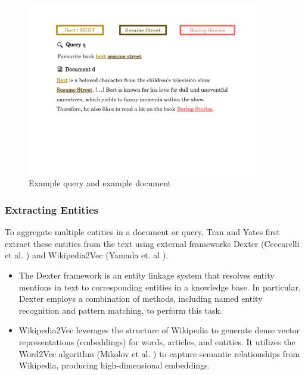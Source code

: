 \begin{figure}[!htb]
    \centering
    \includegraphics[trim={1.5cm 6.7cm 1.5cm 2cm}, clip, width=0.9\textwidth]{resources/example_2} 
    \caption{Example query and example document}
    \label{fig:example}
\end{figure}

\subsubsection{Extracting Entities}\label{subsubsec:extracting_entities}

To aggregate multiple entities in a document or query, Tran and Yates first extract these entities from the text using external frameworks Dexter (Ceccarelli et al. \cite{ceccarelli2013dexter}) and Wikipedia2Vec (Yamada et. al \cite{yamada2018wikipedia2vec}).
\begin{itemize}
    \item The Dexter framework is an entity linkage system that resolves entity mentions in text to corresponding entities in a knowledge base. In particular, Dexter employs a combination of methods, including named entity recognition and pattern matching, to perform this task. 
    \item Wikipedia2Vec leverages the structure of Wikipedia to generate dense vector representations (embeddings) for words, articles, and entities. It utilizes the Word2Vec algorithm (Mikolov et al. \cite{mikolov2013distributed}) to capture semantic relationships from Wikipedia, producing high-dimensional embeddings.
\end{itemize}

